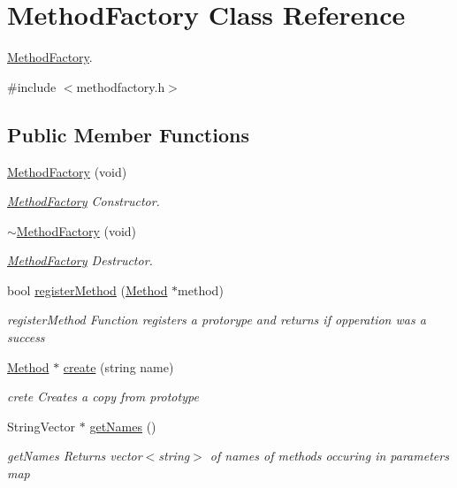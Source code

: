 \hypertarget{class_method_factory}{\section{\-Method\-Factory \-Class \-Reference}
\label{class_method_factory}
}


\hyperlink{class_method_factory}{\-Method\-Factory}.  




{\ttfamily \#include $<$methodfactory.\-h$>$}

\subsection*{\-Public \-Member \-Functions}
\begin{DoxyCompactItemize}
\item 
\hyperlink{class_method_factory_a60a914d6384d33d7b73a04b08c155e18}{\-Method\-Factory} (void)
\begin{DoxyCompactList}\small\item\em \hyperlink{class_method_factory}{\-Method\-Factory} \-Constructor. \end{DoxyCompactList}\item 
\hypertarget{class_method_factory_a64b9ec575d11679f278cf4d98775ff16}{\hyperlink{class_method_factory_a64b9ec575d11679f278cf4d98775ff16}{$\sim$\-Method\-Factory} (void)}\label{class_method_factory_a64b9ec575d11679f278cf4d98775ff16}

\begin{DoxyCompactList}\small\item\em \hyperlink{class_method_factory}{\-Method\-Factory} \-Destructor. \end{DoxyCompactList}\item 
bool \hyperlink{class_method_factory_a55d07b4466dd61e27542b0950d061240}{register\-Method} (\hyperlink{class_method}{\-Method} $\ast$method)
\begin{DoxyCompactList}\small\item\em register\-Method \-Function registers a protorype and returns if opperation was a success \end{DoxyCompactList}\item 
\hyperlink{class_method}{\-Method} $\ast$ \hyperlink{class_method_factory_a0d0766c0633b0b58fa2990471dc92a85}{create} (string name)
\begin{DoxyCompactList}\small\item\em crete \-Creates a copy from prototype \end{DoxyCompactList}\item 
\-String\-Vector $\ast$ \hyperlink{class_method_factory_a1a72c2a160bd8785d7fe823a8b57213d}{get\-Names} ()
\begin{DoxyCompactList}\small\item\em get\-Names \-Returns vector$<$string$>$ of names of methods occuring in parameters map \end{DoxyCompactList}\end{DoxyCompactItemize}


